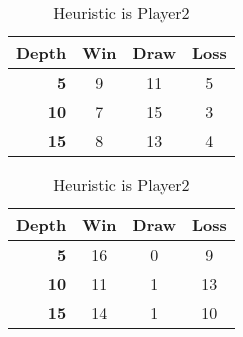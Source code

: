 \documentclass[a4paper]{article}
\begin{document}
\begin{table}[h]
	\centering
	\caption{Heuristic is Player1}
	\begin{tabular}{|r|c|c|c|}
		\hline
		\textbf{Depth} & \multicolumn{1}{l|}{\textbf{Win}} & \multicolumn{1}{l|}{\textbf{Draw}} & \multicolumn{1}{l|}{\textbf{Loss}} \\ \hline
		\textbf{5}     & 9                                 & 11                                 & 5                                  \\ \hline
		\textbf{10}    & 7                                 & 15                                 & 3                                  \\ \hline
		\textbf{15}    & 8                                 & 13                                 & 4                                  \\ \hline
	\end{tabular}
	\caption{Heuristic is Player2}
	\begin{tabular}{|r|c|c|c|}
		\hline
		\textbf{Depth} & \multicolumn{1}{l|}{\textbf{Win}} & \multicolumn{1}{l|}{\textbf{Draw}} & \multicolumn{1}{l|}{\textbf{Loss}} \\ \hline
		\textbf{5}     & 16                                & 0                                  & 9                                  \\ \hline
		\textbf{10}    & 11                                & 1                                  & 13                                 \\ \hline
		\textbf{15}    & 14                                & 1                                  & 10                                 \\ \hline
	\end{tabular}
\end{table}
\end{document}

